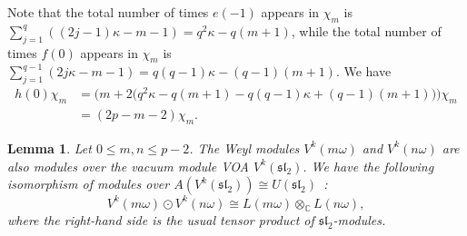 \documentclass[12pt,a4paper,reqno]{amsart}
\numberwithin{equation}{section}
\newtheorem{lemma}[theorem]{Lemma}
\theoremstyle{definition}
\renewcommand{\sl}{\mathfrak{sl}}
\newcommand{\C}{\mathbb{C}}
\def\om{\omega}
\def\o{\otimes}
\begin{document}
Note that the total number of times $e(-1)$ appears in $\chi_m$ is
$
\sum_{j=1}^q ((2j-1)\kappa-m-1)=q^2\kappa-q(m+1)
$,
while the total number of times $f(0)$ appears in $\chi_m$ is
$
\sum_{j=1}^{q-1}(2j\kappa-m-1)=q(q-1)\kappa-(q-1)(m+1).
$ We have
\begin{equation}\label{eq:chimeigenvalue}
\begin{aligned}
    h(0)\chi_m&=\Big(m+2\big(q^2\kappa-q(m+1)-q(q-1)\kappa+(q-1)(m+1)\big)\Big)\chi_m\\
    &=(2p-m-2)\chi_m.
\end{aligned}
\end{equation}


\begin{lemma}\label{lm:6.3}
Let $0\leq m,n\leq p-2$. The Weyl modules $V^k(m\om)$ and $V^k(n\om)$ are also modules over the vacuum module VOA $V^k(\sl_2)$. We have the following isomorphism of modules over $A(V^k(\sl_2))\cong U(\sl_2)$~\cite{FZ92}:
\[
V^k(m\om)\odot V^k(n\om)\cong L(m\om)\o_\C L(n\om),
\]
where the right-hand side is the usual tensor product of $\sl_2$-modules.
\end{lemma}
\end{document}
